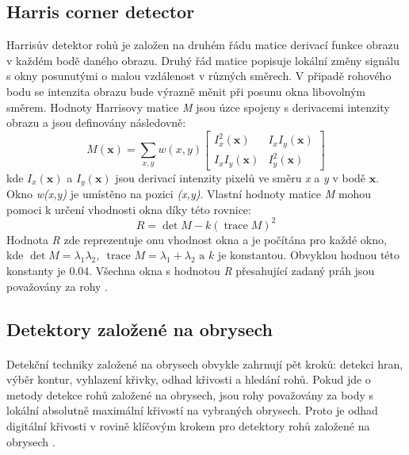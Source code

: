 \subsection*{Harris corner detector}
\label{harrisc}
Harrisův detektor rohů je založen na druhém řádu matice derivací funkce obrazu v každém bodě daného obrazu. Druhý řád matice popisuje lokální změny signálu s okny posunutými o malou vzdálenost v různých směrech. V připadě rohového bodu se intenzita obrazu bude výrazně měnit při posunu okna libovolným směrem. Hodnoty Harrisovy matice \textit{M} jsou úzce spojeny s derivacemi intenzity obrazu a jsou definovány následovně:
\begin{equation}\label{harrismatrix}
M(\mathbf{x})=\sum_{x, y} w(x, y)\left[\begin{array}{cc}
I_x^2(\mathbf{x}) & I_x I_y(\mathbf{x}) \\
I_x I_y(\mathbf{x}) & I_y^2(\mathbf{x})
\end{array}\right]
\end{equation}
kde \begin{math}I_x(\mathbf{x})\end{math} a \begin{math}I_y(\mathbf{x})\end{math} jsou derivací intenzity pixelů ve směru \textit{x} a \textit{y} v bodě \begin{math}\mathbf{x}\end{math}. Okno \textit{w(x,y)} je umístěno na pozici \textit{(x,y)}. Vlastní hodnoty matice \textit{M} mohou pomoci k určení vhodnosti okna díky této rovnice:
\begin{equation}
R=\operatorname{det} M-k(\operatorname{trace} M)^2
\end{equation}
Hodnota \textit{R} zde reprezentuje onu vhodnost okna a je počítána pro každé okno, kde \begin{math}
\operatorname{det} M=\lambda_1 \lambda_2 \text {, }\text { trace } M=\lambda_1+\lambda_2 \text { a } k
\end{math} je konstantou. Obvyklou hodnou této konstanty je 0.04. Všechna okna s hodnotou \textit{R} přesahující zadaný práh jsou považovány za rohy \cite{harris}.






\subsection*{Detektory založené na obrysech}
\paragraph{} Detekční techniky založené na obrysech obvykle zahrnují pět kroků: detekci hran, výběr kontur, vyhlazení křivky, odhad křivosti a hledání rohů. Pokud jde o metody detekce rohů založené na obrysech, jsou rohy považovány za body s lokální absolutně maximální křivostí na vybraných obrysech. Proto je odhad digitální křivosti v rovině klíčovým krokem pro detektory rohů založené na obrysech \cite{contourdetection}.
